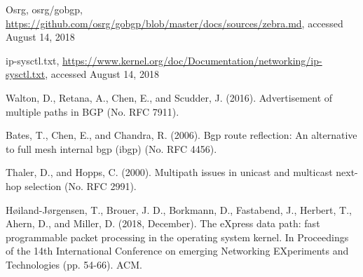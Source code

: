 \begin{thebibliography}{99}
Osrg, osrg/gobgp, \url{https://github.com/osrg/gobgp/blob/master/docs/sources/zebra.md}, accessed August 14, 2018

ip-sysctl.txt, \url{https://www.kernel.org/doc/Documentation/networking/ip-sysctl.txt}, accessed August 14, 2018

Walton, D., Retana, A., Chen, E., and Scudder, J. (2016). Advertisement of multiple paths in BGP (No. RFC 7911).

Bates, T., Chen, E., and  Chandra, R. (2006). Bgp route reflection: An alternative to full mesh internal bgp (ibgp) (No. RFC 4456).

Thaler, D., and Hopps, C. (2000). Multipath issues in unicast and multicast next-hop selection (No. RFC 2991).

Høiland-Jørgensen, T., Brouer, J. D., Borkmann, D., Fastabend, J., Herbert, T., Ahern, D., and Miller, D. (2018, December). The eXpress data path: fast programmable packet processing in the operating system kernel. In Proceedings of the 14th International Conference on emerging Networking EXperiments and Technologies (pp. 54-66). ACM.

  
\end{thebibliography}
